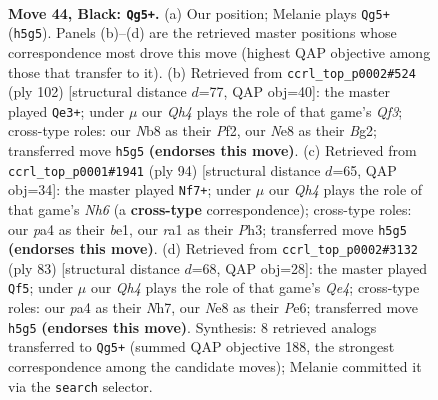 \documentclass[11pt]{article}
\begin{document}
\clearpage

\begin{figure}[p]\centering
\begin{subfigure}{0.46\textwidth}\centering
\resizebox{\linewidth}{!}{%
\newchessgame
\chessboard[
  setfen={1n2nk2/7Q/7p/p4p1q/P7/6K1/2rN4/RN6 b - - 1 44},
  showmover=false,
  pgfstyle=straightmove, color=movearrow, markmove={h5-g5}
]}
\caption{}
\end{subfigure}\hfill
\begin{subfigure}{0.46\textwidth}\centering
\resizebox{\linewidth}{!}{%
\newchessgame
\chessboard[
  setfen={4k3/8/2Nn1r2/2pP1q2/5P2/5Q2/5PB1/6K1 w - - 2 52},
  showmover=false,
  pgfstyle=straightmove, color=movearrow, markmove={f3-e3}
]}
\caption{}
\end{subfigure}
\\[4pt]
\begin{subfigure}{0.46\textwidth}\centering
\resizebox{\linewidth}{!}{%
\newchessgame
\chessboard[
  setfen={5q1k/6n1/2P1pPQN/3r4/8/7P/6P1/4b1K1 w - - 8 48},
  showmover=false,
  pgfstyle=straightmove, color=movearrow, markmove={h6-f7}
]}
\caption{}
\end{subfigure}\hfill
\begin{subfigure}{0.46\textwidth}\centering
\resizebox{\linewidth}{!}{%
\newchessgame
\chessboard[
  setfen={8/6kn/4p1p1/1rNnq3/2R5/1P5N/3Q1PK1/8 b - - 11 42},
  showmover=false,
  pgfstyle=straightmove, color=movearrow, markmove={e5-f5}
]}
\caption{}
\end{subfigure}
\caption{\textbf{Move 44, Black: \texttt{Qg5+}.} (a) Our position; Melanie plays \texttt{Qg5+} (\texttt{h5g5}). Panels (b)--(d) are the retrieved master positions whose correspondence most drove this move (highest QAP objective among those that transfer to it). (b) Retrieved from \texttt{ccrl\_top\_p0002\#524} (ply 102) [structural distance $d$=77, QAP obj=40]: the master played \texttt{Qe3+}; under $\mu$ our \emph{Qh4} plays the role of that game's \emph{Qf3}; cross-type roles: our \emph{N}b8 as their \emph{P}f2, our \emph{N}e8 as their \emph{B}g2; transferred move \texttt{h5g5} \textbf{(endorses this move)}. (c) Retrieved from \texttt{ccrl\_top\_p0001\#1941} (ply 94) [structural distance $d$=65, QAP obj=34]: the master played \texttt{Nf7+}; under $\mu$ our \emph{Qh4} plays the role of that game's \emph{Nh6} (a \textbf{cross-type} correspondence); cross-type roles: our \emph{p}a4 as their \emph{b}e1, our \emph{r}a1 as their \emph{P}h3; transferred move \texttt{h5g5} \textbf{(endorses this move)}. (d) Retrieved from \texttt{ccrl\_top\_p0002\#3132} (ply 83) [structural distance $d$=68, QAP obj=28]: the master played \texttt{Qf5}; under $\mu$ our \emph{Qh4} plays the role of that game's \emph{Qe4}; cross-type roles: our \emph{p}a4 as their \emph{N}h7, our \emph{N}e8 as their \emph{P}e6; transferred move \texttt{h5g5} \textbf{(endorses this move)}. Synthesis: 8 retrieved analogs transferred to \texttt{Qg5+} (summed QAP objective 188, the strongest correspondence among the candidate moves); Melanie committed it via the \texttt{search} selector.}
\label{fig:thought-m87}
\end{figure}
\end{document}
